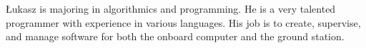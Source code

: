 \documentclass[class=report, crop=false]{standalone}
\begin{document}
Łukasz is majoring in algorithmics and programming. 
He is a very talented programmer with experience in various languages.
His job is to create, supervise, and manage software for both the onboard computer and the ground station.
\end{document}
